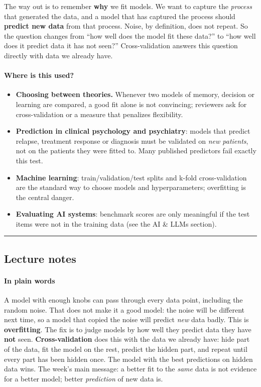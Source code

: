 The way out is to remember \textbf{why} we fit models. We want to
capture the \emph{process} that generated the data, and a model that has
captured the process should \textbf{predict new data} from that process.
Noise, by definition, does not repeat. So the question changes from
``how well does the model fit these data?'' to ``how well does it
predict data it has not seen?'' Cross-validation answers this question
directly with data we already have.

\paragraph{Where is this used?}

\begin{itemize}
\tightlist
\item
  \textbf{Choosing between theories.} Whenever two models of memory,
  decision or learning are compared, a good fit alone is not convincing;
  reviewers ask for cross-validation or a measure that penalizes
  flexibility.
\item
  \textbf{Prediction in clinical psychology and psychiatry}: models that
  predict relapse, treatment response or diagnosis must be validated on
  \emph{new patients}, not on the patients they were fitted to. Many
  published predictors fail exactly this test.
\item
  \textbf{Machine learning}: train/validation/test splits and k-fold
  cross-validation are the standard way to choose models and
  hyperparameters; overfitting is the central danger.
\item
  \textbf{Evaluating AI systems}: benchmark scores are only meaningful
  if the test items were not in the training data (see the AI \& LLMs
  section).
\end{itemize}

\begin{center}\rule{0.5\linewidth}{0.5pt}\end{center}


\subsection{Lecture notes}

\paragraph{In plain words}

A model with enough knobs can pass through every data point, including
the random noise. That does not make it a good model: the noise will be
different next time, so a model that copied the noise will predict
\emph{new} data badly. This is \textbf{overfitting}. The fix is to judge
models by how well they predict data they have \textbf{not} seen.
\textbf{Cross-validation} does this with the data we already have: hide
part of the data, fit the model on the rest, predict the hidden part,
and repeat until every part has been hidden once. The model with the
best predictions on hidden data wins. The week's main message: a better
fit to the \emph{same} data is not evidence for a better model; better
\emph{prediction} of new data is.

